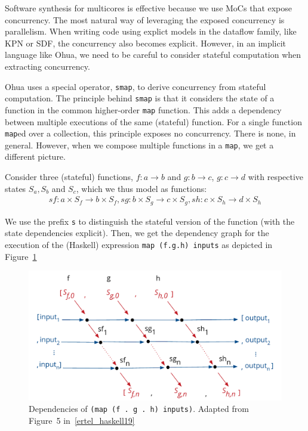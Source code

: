 Software synthesis for multicores is effective because we use \acp{MoC} that expose concurrency.
The most natural way of leveraging the exposed concurrency is parallelism. 
When writing code using explict models in the dataflow family, like \ac{KPN} or \ac{SDF}, the concurrency also becomes explicit.
However, in an implicit language like Ohua, we need to be careful to consider stateful computation when extracting concurrency.

Ohua uses a special operator, \texttt{smap}, to derive concurrency from stateful computation.
The principle behind \texttt{smap} is that it considers the state of a function in the common higher-order \texttt{map} function.
This adds a dependency between multiple executions of the same (stateful) function.
For a single function \texttt{map}ed over a collection, this principle exposes no concurrency. There is none, in general.
However, when we compose multiple functions in a \texttt{map}, we get a different picture.

Consider three (stateful) functions, $f: a \rightarrow b$ and $g : b \rightarrow c$, $g : c \rightarrow d$ with respective states $S_a, S_b$ and $S_c$, which we thus model as functions: 
\begin{align*}
sf : a \times S_f \rightarrow b \times S_f, sg : b \times S_g \rightarrow c \times S_g, sh : c \times S_h \rightarrow d \times S_h
\end{align*}

We use the prefix \texttt{s} to distinguish the stateful version of the function (with the state dependencies explicit).
Then, we get the dependency graph for the execution of the (Haskell) expression \texttt{map (f.g.h) inputs} as depicted in Figure~\ref{fig:smap_state}

\begin{figure}[t]
	\centering
	\includegraphics[scale=0.4]{figures/smap_state.pdf}
	\caption{ Dependencies of \texttt{(map (f . g . h) inputs)}. Adapted from Figure~5 in~\ref{ertel_haskell19}}
	\label{fig:smap_state}
\end{figure}

